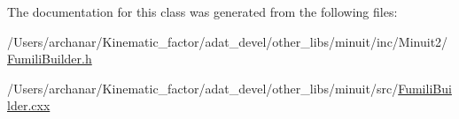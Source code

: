 The documentation for this class was generated from the following files\+:\begin{DoxyCompactItemize}
\item 
/\+Users/archanar/\+Kinematic\+\_\+factor/adat\+\_\+devel/other\+\_\+libs/minuit/inc/\+Minuit2/\mbox{\hyperlink{other__libs_2minuit_2inc_2Minuit2_2FumiliBuilder_8h}{Fumili\+Builder.\+h}}\item 
/\+Users/archanar/\+Kinematic\+\_\+factor/adat\+\_\+devel/other\+\_\+libs/minuit/src/\mbox{\hyperlink{FumiliBuilder_8cxx}{Fumili\+Builder.\+cxx}}\end{DoxyCompactItemize}
